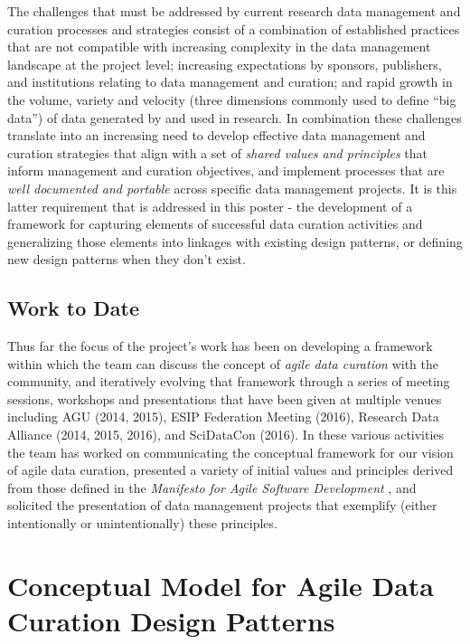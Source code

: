 \documentclass[final]{beamer}
\begin{document}
\begin{frame}[t]
\begin{multicols}{3}
The challenges that must be addressed by current research data
management and curation processes and strategies consist of a
combination of established practices that are not compatible with
increasing complexity in the data management landscape at the project
level; increasing expectations by sponsors, publishers, and institutions
relating to data management and curation; and rapid growth in the
volume, variety and velocity (three dimensions commonly used to define
``big data'') of data generated by and used in research. In combination
these challenges translate into an increasing need to develop effective
data management and curation strategies that align with a set of
\emph{shared values and principles} that inform management and curation
objectives, and implement processes that are \emph{well documented and
portable} across specific data management projects. It is this latter
requirement that is addressed in this poster - the development of a
framework for capturing elements of successful data curation activities
and generalizing those elements into linkages with existing design
patterns, or defining new design patterns when they don't exist.

\subsection{Work to Date}\label{work-to-date}

Thus far the focus of the project's work has been on developing a
framework within which the team can discuss the concept of \emph{agile
data curation} with the community, and iteratively evolving that
framework through a series of meeting sessions, workshops and
presentations that have been given at multiple venues including AGU
(2014, 2015), ESIP Federation Meeting (2016), Research Data Alliance
(2014, 2015, 2016), and SciDataCon (2016). In these various activities
the team has worked on communicating the conceptual framework for our
vision of agile data curation, presented a variety of initial values and
principles derived from those defined in the \emph{Manifesto for Agile
Software Development} \citep{beck_manifesto_2001}, and solicited the
presentation of data management projects that exemplify (either
intentionally or unintentionally) these principles.

\section{Conceptual Model for Agile Data Curation Design
Patterns}\label{conceptual-model-for-agile-data-curation-design-patterns}


\end{multicols}
\end{frame}
\end{document}
